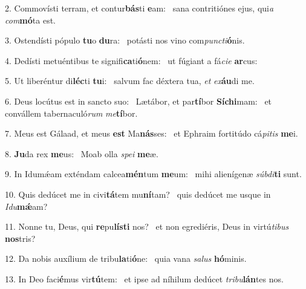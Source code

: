2. Commovísti terram, et contur\textbf{bás}ti \textbf{e}am: \ast\  sana contritiónes ejus, qui\textit{a} \textit{com}\textbf{mó}ta est.\

3. Ostendísti pópulo \textbf{tu}o \textbf{du}ra: \ast\  potásti nos vino com\textit{punc}\textit{ti}\textbf{ó}nis.\

4. Dedísti metuéntibus te signifi\textbf{ca}ti\textbf{ó}nem: \ast\  ut fúgiant a fá\textit{ci}\textit{e} \textbf{ar}cus:\

5. Ut liberéntur di\textbf{léc}ti \textbf{tu}i: \ast\  salvum fac déxtera tua, \textit{et} \textit{ex}\textbf{áu}di me.\

6. Deus locútus est in sancto suo: \dag\  Lætábor, et par\textbf{tí}bor \textbf{Sí}\textbf{chi}mam: \ast\  et convállem tabernaculó\textit{rum} \textit{me}\textbf{tí}bor.\

7. Meus est Gálaad, et meus \textbf{est} Ma\textbf{nás}ses: \ast\  et Ephraim fortitúdo cá\textit{pi}\textit{tis} \textbf{me}i.\

8. \textbf{Ju}da rex \textbf{me}us: \ast\  Moab olla \textit{spe}\textit{i} \textbf{me}æ.\

9. In Idumǽam exténdam calcea\textbf{mén}tum \textbf{me}um: \ast\  mihi alienígenæ \textit{súb}\textit{di}\textbf{ti} sunt.\

10. Quis dedúcet me in civi\textbf{tá}tem mu\textbf{ní}tam? \ast\  quis dedúcet me usque in \textit{I}\textit{du}\textbf{mǽ}am?\

11. Nonne tu, Deus, qui \textbf{re}pu\textbf{lís}\textbf{ti} nos? \ast\  et non egrediéris, Deus in virtú\textit{ti}\textit{bus} \textbf{nos}tris?\

12. Da nobis auxílium de tribu\textbf{la}ti\textbf{ó}ne: \ast\  quia vana \textit{sa}\textit{lus} \textbf{hó}minis.\

13. In Deo faci\textbf{é}mus vir\textbf{tú}tem: \ast\  et ipse ad níhilum dedúcet \textit{tri}\textit{bu}\textbf{lán}tes nos.\

